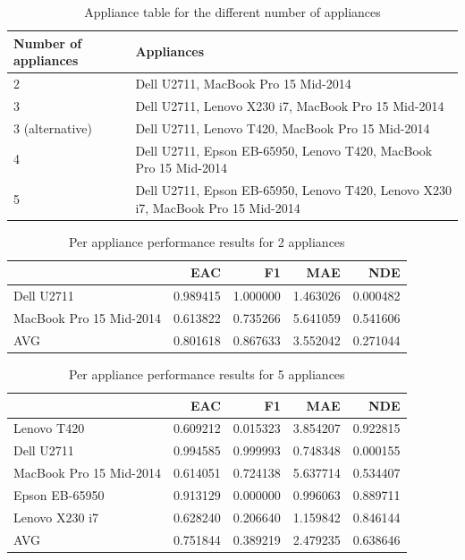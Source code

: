 \documentclass[sigconf]{acmart}
\begin{document}
\begin{table}
  \caption{Appliance table for the different number of appliances}
  \label{tab:apps}
  \begin{tabular}{ll}
    \hline\hline
    \toprule
    Number of appliances & Appliances \\
    \hline
    \midrule
    2               &                                               Dell U2711, MacBook Pro 15 Mid-2014 \\
    3                &                               Dell U2711, Lenovo X230 i7, MacBook Pro 15 Mid-2014 \\
    3 (alternative)  &                                  Dell U2711, Lenovo T420, MacBook Pro 15 Mid-2014 \\
    4                &                  Dell U2711, Epson EB-65950, Lenovo T420, MacBook Pro 15 Mid-2014 \\
    5               &  Dell U2711, Epson EB-65950, Lenovo T420, Lenovo X230 i7, MacBook Pro 15 Mid-2014 \\
    \bottomrule
    \end{tabular}
\end{table}

\begin{table}
  \caption{Per appliance performance results for 2 appliances}
  \label{tab:2apps}
  \begin{tabular}{lrrrr}
    \hline\hline
    \toprule
    {} &       EAC &        F1 &       MAE &       NDE \\
    \hline
    \midrule
    Dell U2711              &  0.989415 &  1.000000 &  1.463026 &  0.000482 \\
    MacBook Pro 15 Mid-2014 &  0.613822 &  0.735266 &  5.641059 &  0.541606 \\ \hline
    AVG                     &  0.801618 &  0.867633 &  3.552042 &  0.271044 \\
    \bottomrule
    \end{tabular}
\end{table}

\begin{table}
  \caption{Per appliance performance results for 5 appliances}
  \label{tab:5apps}
  \begin{tabular}{lrrrr}
    \hline\hline
    \toprule
    {} &       EAC &        F1 &       MAE &       NDE \\
    \hline
    \midrule
    Lenovo T420             &  0.609212 &  0.015323 &  3.854207 &  0.922815 \\
    Dell U2711              &  0.994585 &  0.999993 &  0.748348 &  0.000155 \\
    MacBook Pro 15 Mid-2014 &  0.614051 &  0.724138 &  5.637714 &  0.534407 \\
    Epson EB-65950          &  0.913129 &  0.000000 &  0.996063 &  0.889711 \\
    Lenovo X230 i7          &  0.628240 &  0.206640 &  1.159842 &  0.846144 \\ \hline
    AVG                     &  0.751844 &  0.389219 &  2.479235 &  0.638646 \\
    \bottomrule
    \end{tabular}    
\end{table}
\end{document}
